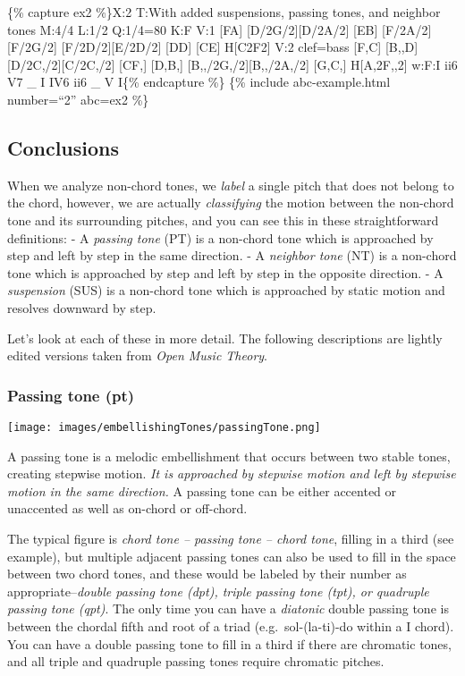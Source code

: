 \documentclass{book}
\begin{document}
\{\% capture ex2 \%\}X:2 T:With added suspensions, passing tones, and neighbor
tones M:4/4 L:1/2 Q:1/4=80 K:F V:1 {[}FA{]}\textbar{} {[}D/2G/2{]}{[}D/2A/2{]}
{[}EB{]}\textbar{} {[}F/2A/2{]}{[}F/2G/2{]} {[}F/2D/2{]}{[}E/2D/2{]}\textbar{}
{[}DD{]} {[}CE{]}\textbar{} H{[}C2F2{]}\textbar{]} V:2 clef=bass
{[}F,C{]}\textbar{} {[}B,,D{]} {[}D/2C,/2{]}{[}C/2C,/2{]}\textbar{} {[}CF,{]}
{[}D,B,{]}\textbar{} {[}B,,/2G,/2{]}{[}B,,/2A,/2{]} {[}G,C,{]}\textbar{}
H{[}A,2F,,2{]}\textbar{]} w:F:I ii6 V7 \_ I IV6 ii6 \_ V I\{\% endcapture \%\}
\{\% include abc-example.html number=``2'' abc=ex2 \%\}

\hypertarget{conclusions-16}{%
\subsection{Conclusions}\label{conclusions-16}}

When we analyze non-chord tones, we \emph{label} a single pitch that does not
belong to the chord, however, we are actually \emph{classifying} the motion
between the non-chord tone and its surrounding pitches, and you can see this
in these straightforward definitions: - A \emph{passing tone} (PT) is a
non-chord tone which is approached by step and left by step in the same
direction. - A \emph{neighbor tone} (NT) is a non-chord tone which is
approached by step and left by step in the opposite direction. - A
\emph{suspension} (SUS) is a non-chord tone which is approached by static
motion and resolves downward by step.

Let's look at each of these in more detail. The following descriptions are
lightly edited versions taken from \emph{Open Music Theory}.

\hypertarget{passing-tone-pt}{%
\subsubsection{Passing tone (pt)}\label{passing-tone-pt}}

\texttt{[image: images/embellishingTones/passingTone.png]}

A passing tone is a melodic embellishment that occurs between two stable
tones, creating stepwise motion. \emph{It is approached by stepwise motion and
left by stepwise motion in the same direction.} A passing tone can be either
accented or unaccented as well as on-chord or off-chord.

The typical figure is \emph{chord tone -- passing tone -- chord tone}, filling
in a third (see example), but multiple adjacent passing tones can also be used
to fill in the space between two chord tones, and these would be labeled by
their number as appropriate--\emph{double passing tone (dpt), triple passing
tone (tpt), or quadruple passing tone (qpt)}. The only time you can have a
\emph{diatonic} double passing tone is between the chordal fifth and root of a
triad (e.g.~sol-(la-ti)-do within a I chord). You can have a double passing
tone to fill in a third if there are chromatic tones, and all triple and
quadruple passing tones require chromatic pitches.
\end{document}
